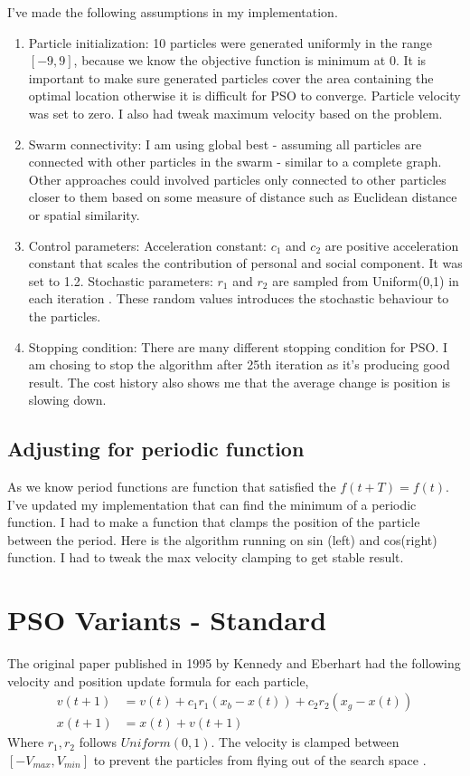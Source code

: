 \documentclass{article}
\begin{document}
I've made the following assumptions in my implementation.
\begin{enumerate}
  \item Particle initialization: 10 particles were generated uniformly in the range $[-9, 9]$, because we know the objective function is minimum at 0. It is important to make sure generated particles cover the area containing the optimal location otherwise it is difficult for PSO to converge. Particle velocity was set to zero. I also had tweak maximum velocity based on the problem.
  \item Swarm connectivity: I am using global best - assuming all particles are connected with other particles in the swarm - similar to a complete graph. Other approaches could involved particles only connected to other particles closer to them based on some measure of distance such as Euclidean distance or spatial similarity.
  \item Control parameters: 
  \subitem Acceleration constant: $c_1$ and $c_2$ are positive acceleration constant that scales the contribution of personal and social component. It was  set to 1.2.
  \subitem Stochastic parameters: $r_1$ and $r_2$ are sampled from Uniform(0,1) in each iteration \cite{engelbrecht2007computational}. These random values introduces the stochastic behaviour to the particles.
  \item Stopping condition: There are many different stopping condition for PSO. I am chosing to stop the algorithm after 25th iteration as it's producing good result. The cost history also shows me that the average change is position is slowing down.
\end{enumerate}

\subsection{Adjusting for periodic function}
As we know period functions are function that satisfied the $f(t + T) = f(t)$. I've updated my implementation that can find the minimum of a  periodic function. I had to make a function that clamps the position of the particle between the period. Here is the algorithm running on sin (left) and cos(right) function. I had to tweak the max velocity clamping to get stable result.


\section{PSO Variants - Standard}
The original paper published in 1995 by Kennedy and Eberhart had the following velocity and position update formula for each particle, 
\begin{align*}
v(t+1) &= v(t) + c_1r_1(x_b - x(t)) + c_2r_2(x_g - x(t)) \\
x(t+1) &= x(t) + v(t+1) 
\end{align*}
Where $r_1, r_2$ follows $Uniform(0,1)$. The velocity is clamped between $[-V_{max}, V_{min}]$ to prevent the particles from flying out of the search space \cite{kennedy1995particle}.
\end{document}
